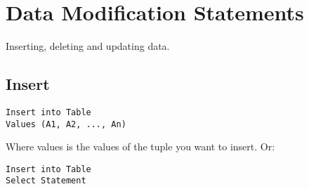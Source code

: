 \documentclass[11pt, oneside]{article}   	%
\begin{document}
\section{Data Modification Statements}

Inserting, deleting and updating data. 

\subsection{Insert}

\begin{lstlisting}
Insert into Table
Values (A1, A2, ..., An)
\end{lstlisting}

Where values is the values of the tuple you want to insert. Or:

\begin{lstlisting}
Insert into Table
Select Statement
\end{lstlisting}
\end{document}
